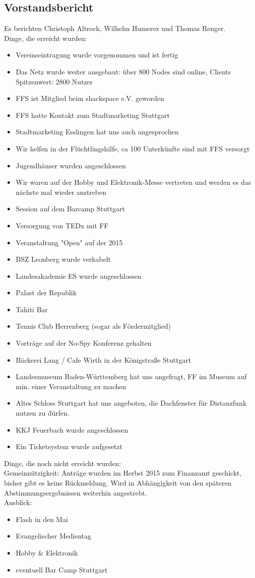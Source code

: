 \documentclass[a4paper]{scrartcl}
\begin{document}
\subsection{Vorstandsbericht}
Es berichten Christoph Altrock, Wilhelm Humerez und Thomas Renger.\\
Dinge, die erreicht wurden:
\begin{itemize}
\item Vereinseintragung wurde vorgenommen und ist fertig
\item Das Netz wurde weiter ausgebaut: über 800 Nodes sind online, Clients Spitzenwert: 2800 Nutzer
\item FFS ist Mitglied beim shackspace e.V. geworden
\item FFS hatte Kontakt zum Stadtmarketing Stuttgart
\item Stadtmarketing Esslingen hat uns auch angesprochen
\item Wir helfen in der Flüchtlingshilfe, ca 100 Unterkünfte sind mit FFS versorgt
\item Jugendhäuser wurden angeschlossen
\item Wir waren auf der Hobby und Elektronik-Messe vertreten und werden es das nächste mal wieder anstreben
\item Session auf dem Barcamp Stuttgart
\item Versorgung von TEDx mit FF
\item Veranstaltung "Open" auf der 2015
\item BSZ Leonberg wurde verkabelt
\item Landesakademie ES wurde angeschlossen
\item Palast der Republik
\item Tahiti Bar
\item Tennis Club Herrenberg (sogar als Fördermitglied)
\item Vorträge auf der No-Spy Konferenz gehalten
\item Bäckerei Lang / Cafe Wirth in der Königstraße Stuttgart
\item Landesmuseum Baden-Württemberg hat uns angefragt, FF im Museum auf min. einer Veranstaltung zu machen
\item Altes Schloss Stuttgart hat uns angeboten, die Dachfenster für Distanzfunk nutzen zu dürfen.
\item KKJ Feuerbach wurde angeschlossen
\item Ein Ticketsystem wurde aufgesetzt
\end{itemize}
Dinge, die noch nicht erreicht wurden:\\
Gemeinnützigkeit: Anträge wurden im Herbst 2015 zum Finanzamt geschickt, bisher gibt es keine Rückmeldung. Wird in Abhängigkeit von den späteren Abstimmungsergebnissen weiterhin angestrebt.\\
Ausblick:
\begin{itemize}
\item Flash in den Mai
\item Evangelischer Medientag
\item Hobby \& Elektronik
\item eventuell Bar Camp Stuttgart
\end{itemize}
\end{document}
